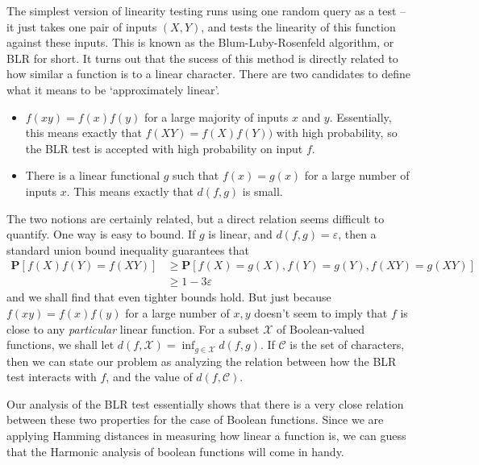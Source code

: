 The simplest version of linearity testing runs using one random query as a test -- it just takes one pair of inputs $(X,Y)$, and tests the linearity of this function against these inputs. This is known as the Blum-Luby-Rosenfeld algorithm, or BLR for short. It turns out that the sucess of this method is directly related to how similar a function is to a linear character. There are two candidates to define what it means to be `approximately linear'.
%
\begin{itemize}
    \item $f(xy) = f(x) f(y)$ for a large majority of inputs $x$ and $y$. Essentially, this means exactly that $f(XY) = f(X)f(Y))$ with high probability, so the BLR test is accepted with high probability on input $f$.
    \item There is a linear functional $g$ such that $f(x) = g(x)$ for a large number of inputs $x$. This means exactly that $d(f,g)$ is small.
\end{itemize}
%
The two notions are certainly related, but a direct relation seems difficult to quantify. One way is easy to bound. If $g$ is linear, and $d(f,g) = \varepsilon$, then a standard union bound inequality guarantees that
%
\begin{align*}
    \mathbf{P}[f(X) f(Y) = f(XY)] &\geq \mathbf{P}[f(X) = g(X), f(Y) = g(Y), f(XY) = g(XY)]\\
    &\geq 1 - 3 \varepsilon
\end{align*}
%
and we shall find that even tighter bounds hold. But just because $f(xy) = f(x)f(y)$ for a large number of $x,y$ doesn't seem to imply that $f$ is close to any {\it particular} linear function. For a subset $\mathcal{X}$ of Boolean-valued functions, we shall let $d(f,\mathcal{X}) = \inf_{g \in \mathcal{X}} d(f,g)$. If $\mathcal{C}$ is the set of characters, then we can state our problem as analyzing the relation between how the BLR test interacts with $f$, and the value of $d(f,\mathcal{C})$.

Our analysis of the BLR test essentially shows that there is a very close relation between these two properties for the case of Boolean functions. Since we are applying Hamming distances in measuring how linear a function is, we can guess that the Harmonic analysis of boolean functions will come in handy.

